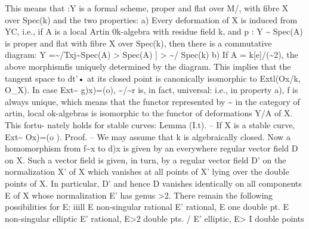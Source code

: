 \documentclass[11pt]{article}
\theoremstyle{plain}
\theoremstyle{definition}
\theoremstyle{remark}
\begin{document}
This means that :Y is a formal scheme, proper and flat over M/, with fibre X over Spec(k) and the two properties: a) Every deformation of X is induced from YC, i.e., if A is a local Artin 0k-algebra with residue field k, and p : Y \textasciitilde{} Spec(A) is proper and flat with fibre X over Spec(k), then there is a commutative diagram: Y =\textasciitilde{}/Txj\textasciitilde{}Spec(A) > Spec(A) ] > \textasciitilde{}/ Spec(k) b) If A = k[e]/(\textasciitilde{}2), the above morphismfis uniquely determined by the diagram. This implies that the tangent space to dt'• at its closed point is canonically isomorphic to Extl(Ox/k, O\_X). In case Ext\textasciitilde{} g)x)=(o), \textasciitilde{}/\textasciitilde{}r is, in fact, universal: i.e., in property a), f is always unique, which means that the functor represented by \textasciitilde{} in the category of artin, local ok-algebras is isomorphic to the functor of deformations Y/A of X. This fortu- nately holds for stable curves: Lemma (I.t). -- If X is a stable curve, Ext\textasciitilde{} Ox)=(o ). Proof. -- We may assume that k is algebraically closed. Now a homomorphism from f\textasciitilde{}x to d)x is given by an everywhere regular vector field D on X. Such a vector field is given, in turn, by a regular vector field D' on the normalization X' of X which vanishes at all points of X' lying over the double points of X. In particular, D' and hence D vanishes identically on all components E of X whose normalization E' has genus >2. There remain the following possibilities for E: iiill E non-singular rational E' rational, E one double pt. E non-singular elliptic E' rational, E>2 double pts. / E' elliptic, E> I double points
\end{document}
